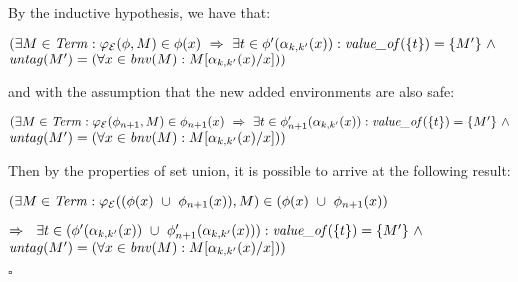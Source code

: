 \documentclass[10pt,a4paper,final,oneside,fleqn]{book}
\begin{document}
\noindent
By the inductive hypothesis, we have that:

\noindent
$(\exists M\in\mbox{{\itshape Term\/}}:\varphi_\mathcal{E}(\phi,M)\in\phi(x)~\Rightarrow~\exists t\in\phi'(\alpha_{k,k'}(x)):\mbox{{\itshape value\_of\/}}(\{t\})=\{M'\}~\wedge$\\
$\mbox{{\itshape untag\/}}(M')=(\forall x\in\mbox{{\itshape bnv\/}}(M):M[\alpha_{k,k'}(x)/x]))$\vspace{5mm}

\noindent
and with the assumption that the new added environments are also safe:

\noindent
$(\exists M\in\mbox{{\itshape Term\/}}:\varphi_\mathcal{E}(\phi_{n+1},M)\in\phi_{n+1}(x)~\Rightarrow~\exists t\in\phi'_{n+1}(\alpha_{k,k'}(x)):\mbox{{\itshape value\_of\/}}(\{t\})=\{M'\}~\wedge$\\
$\mbox{{\itshape untag\/}}(M')=(\forall x\in\mbox{{\itshape bnv\/}}(M):M[\alpha_{k,k'}(x)/x]))$\vspace{5mm}

\noindent
Then by the properties of set union, it is possible to arrive at the following result:

\noindent
$(\exists M\in\mbox{{\itshape Term\/}}:\varphi_\mathcal{E}((\phi(x)~\cup~\phi_{n+1}(x)),M)\in(\phi(x)~\cup~\phi_{n+1}(x))$\vspace{5mm}

\noindent
$\Rightarrow~~\exists t\in(\phi'(\alpha_{k,k'}(x))~\cup~\phi'_{n+1}(\alpha_{k,k'}(x))):\mbox{{\itshape value\_of\/}}(\{t\})=\{M'\}~\wedge$\\
$\mbox{{\itshape untag\/}}(M')=(\forall x\in\mbox{{\itshape bnv\/}}(M):M[\alpha_{k,k'}(x)/x]))$

\vfill
\noindent
$\square$
\newpage
\end{document}
